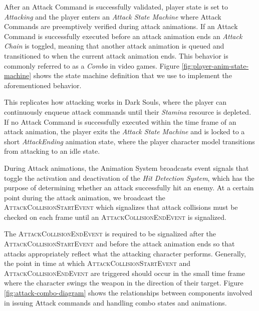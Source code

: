 After an Attack Command is successfully validated, player state is set to \emph{Attacking} and the player enters an \emph{Attack State Machine} where Attack Commands are preemptively verified during attack animations. If an Attack Command is successfully executed before an attack animation ends an \emph{Attack Chain} is toggled, meaning that another attack animation is queued and transitioned to when the current attack animation ends. This behavior is commonly referred to as a \emph{Combo} in video games. Figure \ref{fig:player-anim-state-machine} shows the state machine definition that we use to implement the aforementioned behavior.

This replicates how attacking works in Dark Souls, where the player can continuously enqueue attack commands until their \emph{Stamina} resource is depleted. If no Attack Command is successfully executed within the time frame of an attack animation, the player exits the \emph{Attack State Machine} and is locked to a short \emph{AttackEnding} animation state, where the player character model transitions from attacking to an idle state.



During Attack animations, the Animation System broadcasts event signals that toggle the activation and deactivation of the \emph{Hit Detection System}, which has the purpose of determining whether an attack successfully hit an enemy. At a certain point during the attack animation, we broadcast the \textsc{AttackCollisionStartEvent} which signalizes that attack collisions must be checked on each frame until an \textsc{AttackCollisionEndEvent} is signalized.

The \textsc{AttackCollisionEndEvent} is required to be signalized after the \textsc{AttackCollisionStartEvent} and before the attack animation ends so that attacks appropriately reflect what the attacking character performs. Generally, the point in time at which \textsc{AttackCollisionStartEvent} and \textsc{AttackCollisionEndEvent} are triggered should occur in the small time frame where the character swings the weapon in the direction of their target. Figure \ref{fig:attack-combo-diagram} shows the relationships between components involved in issuing Attack commands and handling combo states and animations.


